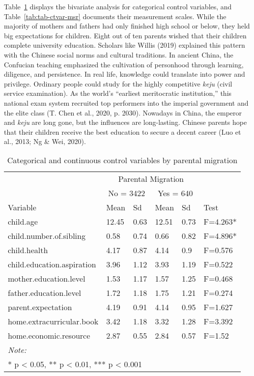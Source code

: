 \documentclass[
  man,floatsintext]{apa7}
\begin{document}
\newpage

Table~\ref{tab:tab-ctvar-cnt} displays the bivariate analysis for categorical control variables, and Table~\ref{tab:tab-ctvar-msr} documents their measurement scales. While the majority of mothers and fathers had only finished high school or below, they held big expectations for children. Eight out of ten parents wished that their children complete university education. Scholars like Willis (2019) explained this pattern with the Chinese social norms and cultural traditions. In ancient China, the Confucian teaching emphasized the cultivation of personhood through learning, diligence, and persistence. In real life, knowledge could translate into power and privilege. Ordinary people could study for the highly competitive \emph{keju} (civil service examination). As the world's ``earliest meritocratic institution,'' this national exam system recruited top performers into the imperial government and the elite class (T. Chen et al., 2020, p. 2030). Nowadays in China, the emperor and \emph{keju} are long gone, but the influences are long-lasting. Chinese parents hope that their children receive the best education to secure a decent career (Luo et al., 2013; Ng \& Wei, 2020).

\begin{table}

\caption{\label{tab:tab-ctvar-cnt}Categorical and continuous control variables by parental migration}
\centering
\begin{tabular}[t]{llllll}
\toprule
\multicolumn{1}{c}{ } & \multicolumn{4}{c}{Parental Migration} \\
\cmidrule(l{3pt}r{3pt}){2-5}
\multicolumn{1}{c}{ } & \multicolumn{2}{c}{No = 3422} & \multicolumn{2}{c}{Yes = 640} \\
\cmidrule(l{3pt}r{3pt}){2-3} \cmidrule(l{3pt}r{3pt}){4-5}
Variable & Mean & Sd & Mean & Sd & Test\\
\midrule
child.age & 12.45 & 0.63 & 12.51 & 0.73 & F=4.263*\\
child.number.of.sibling & 0.58 & 0.74 & 0.66 & 0.82 & F=4.896*\\
child.health & 4.17 & 0.87 & 4.14 & 0.9 & F=0.576\\
child.education.aspiration & 3.96 & 1.12 & 3.93 & 1.19 & F=0.522\\
mother.education.level & 1.53 & 1.17 & 1.57 & 1.25 & F=0.468\\
\addlinespace
father.education.level & 1.72 & 1.18 & 1.75 & 1.21 & F=0.274\\
parent.expectation & 4.19 & 0.91 & 4.14 & 0.95 & F=1.627\\
home.extracurricular.book & 3.42 & 1.18 & 3.32 & 1.28 & F=3.392\\
home.economic.resource & 2.87 & 0.55 & 2.84 & 0.57 & F=1.52\\
\bottomrule
\multicolumn{6}{l}{\rule{0pt}{1em}\textit{Note: }}\\
\multicolumn{6}{l}{\rule{0pt}{1em}* p < 0.05, ** p < 0.01, *** p < 0.001}\\
\end{tabular}
\end{table}
\end{document}
